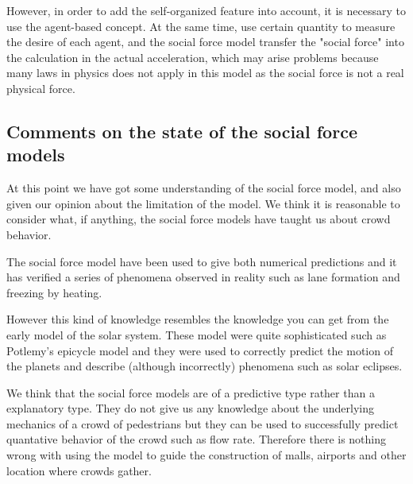 However, in order to add the self-organized feature into account, it is necessary 
to use the agent-based concept.  At the same time, use certain quantity to measure
the desire of each agent, and the social force model transfer the "social force" into 
the calculation in the actual acceleration, which may arise problems because many laws 
in physics does not apply in this model as the social force is not a real 
physical force.

\subsection{Comments on the state of the social force models}
At this point we have got some understanding of the social force model, and 
also given our opinion about the limitation of the model. We think it is 
reasonable to consider what, if anything, the social force models have taught 
us about crowd behavior. 

The social force model have been used to give both numerical predictions 
and it has verified a series of phenomena observed in reality such as 
lane formation and freezing by heating.

However this kind of knowledge resembles the knowledge you can get from 
the early model of the solar system. These model were quite sophisticated 
such as Potlemy's epicycle model and they were used to correctly predict the 
motion of the planets and describe (although incorrectly) phenomena such as 
solar eclipses.

We think that the social force models are of a predictive type rather than 
a explanatory type. They do not give us any knowledge about the underlying 
mechanics of a crowd of pedestrians but they can be used to successfully 
predict quantative behavior of the crowd such as flow rate. Therefore there 
is nothing wrong with using the model to guide the construction of malls, airports 
and other location where crowds gather.
